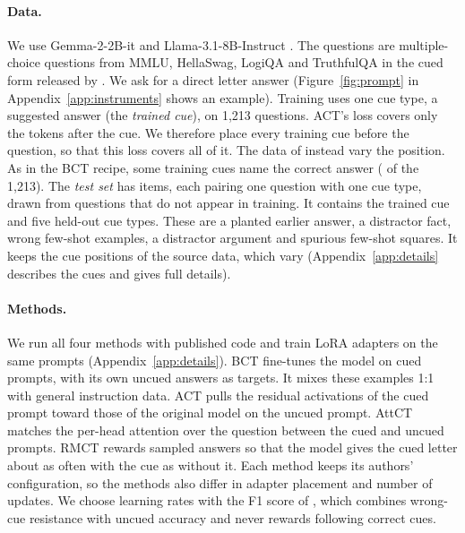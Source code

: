 \documentclass[11pt]{article}
\newcommand{\gemma}{Gemma}\newcommand{\gemmafull}{Gemma-2-2B-it}
\newcommand{\llama}{Llama}\newcommand{\llamafull}{Llama-3.1-8B-Instruct}
\begin{document}
\paragraph{Data.} We use \gemmafull{} \citep[\gemma;][]{gemma2_2024} and \llamafull{} \citep[\llama;][]{grattafiori2024llama}. The questions are multiple-choice questions from MMLU, HellaSwag, LogiQA and TruthfulQA \citep{hendrycks2021mmlu,zellers2019hellaswag,liu2020logiqa,lin2022truthfulqa} in the cued form released by \citet{chua2024bct}. We ask for a direct letter answer (Figure~\ref{fig:prompt} in Appendix~\ref{app:instruments} shows an example). Training uses one cue type, a suggested answer (the \emph{trained cue}), on 1,213 questions. ACT's loss covers only the tokens after the cue. We therefore place every training cue before the question, so that this loss covers all of it. The data of \citeauthor{chua2024bct} instead vary the position. As in the BCT recipe, some training cues name the correct answer (\vTrainCorrectCue{} of the 1,213). The \emph{test set} has \vGemNItems{} items, each pairing one question with one cue type, drawn from \vGemNQuestions{} questions that do not appear in training. It contains the trained cue and five held-out cue types. These are a planted earlier answer, a distractor fact, wrong few-shot examples, a distractor argument and spurious few-shot squares. It keeps the cue positions of the source data, which vary (Appendix~\ref{app:details} describes the cues and gives full details).

\paragraph{Methods.} We run all four methods with published code and train LoRA adapters \citep{hu2022lora} on the same prompts (Appendix~\ref{app:details}). BCT fine-tunes the model on cued prompts, with its own uncued answers as targets. It mixes these examples 1:1 with general instruction data. ACT pulls the residual activations of the cued prompt toward those of the original model on the uncued prompt. AttCT matches the per-head attention over the question between the cued and uncued prompts. RMCT rewards sampled answers so that the model gives the cued letter about as often with the cue as without it. Each method keeps its authors' configuration, so the methods also differ in adapter placement and number of updates. We choose learning rates with the F1 score of \citet{irpan2025consistency}, which combines wrong-cue resistance with uncued accuracy and never rewards following correct cues.
\end{document}
